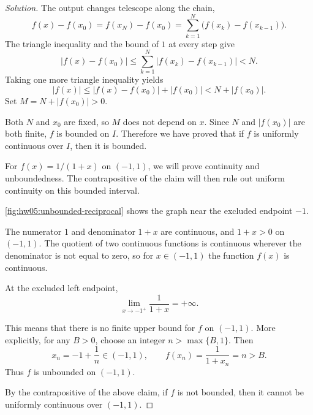 \begin{proof}[Solution]
The output changes telescope along the chain,
\[
  f(x)-f(x_0)=f(x_N)-f(x_0)
    =\sum_{k=1}^N\bigl(f(x_k)-f(x_{k-1})\bigr).
\]
The triangle inequality and the bound of $1$ at every step give
\[
  |f(x)-f(x_0)|
    \le\sum_{k=1}^N|f(x_k)-f(x_{k-1})|<N.
\]
Taking one more triangle inequality yields
\[
  |f(x)|\le |f(x)-f(x_0)|+|f(x_0)|<N+|f(x_0)|.
\]
Set $M=N+|f(x_0)|>0$.

Both $N$ and $x_0$ are fixed, so $M$ does not depend on $x$.
Since $N$ and $|f(x_0)|$ are both finite, $f$ is bounded on $I$. Therefore we have
proved that if $f$ is uniformly continuous over $I$, then it is bounded.

For $f(x)=1/(1+x)$ on $(-1,1)$, we will prove
continuity and unboundedness. The contrapositive of the claim will then
rule out uniform continuity on this bounded interval.

\autoref{fig:hw05:unbounded-reciprocal} shows the graph
near the excluded endpoint $-1$.

\begin{marginfigure}
  \centering
  
  \caption[An unbounded continuous function on an open interval.]{%
    The graph of $f(x)=1/(1+x)$ on $(-1,1)$ rises
    without bound as $x$ approaches $-1$ from the right. The dashed line
    is the vertical asymptote. The open point at $(1,1/2)$ is also
    excluded from the graph.}
  \label{fig:hw05:unbounded-reciprocal}
\end{marginfigure}

The numerator $1$ and denominator $1+x$ are continuous,
and $1+x>0$ on $(-1,1)$.
The quotient of two continuous functions is continuous wherever the denominator is
not equal to zero, so for $x \in (-1, 1)$ the function $f(x)$ is continuous.

At the excluded left endpoint,
\[
\lim_{x \rightarrow -1^+} \dfrac{1}{1 + x} = +\infty.
\]

This means that there is no finite upper bound for $f$ on $(-1,1)$.
More explicitly, for any $B>0$, choose an integer $n>\max\{B,1\}$.
Then
\[
  x_n=-1+\frac1n\in(-1,1),\qquad
  f(x_n)=\frac{1}{1+x_n}=n>B.
\]
Thus $f$ is unbounded on $(-1,1)$.

By the contrapositive of the above claim, if $f$ is not bounded, then it cannot be
uniformly continuous over $(-1,1)$.

\end{proof}
